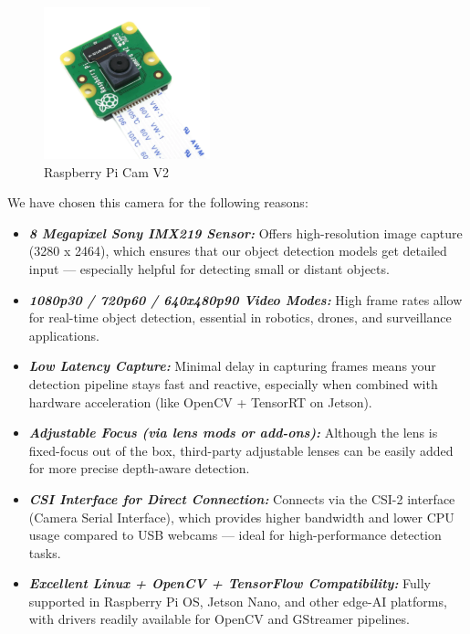 \documentclass[12pt]{report}
\begin{document}
      \begin{figure}
          \includegraphics[width=1\linewidth]{rpicam.png}
          \caption{Raspberry Pi Cam V2}
          \label{fig:rpicam}
        \end{figure}

        
        \noindent We have chosen this camera for the following reasons:
        \begin{itemize}
          \item \textbf{\textit{8 Megapixel Sony IMX219 Sensor:}} Offers high-resolution image capture (3280 x 2464), which ensures that our object detection models get detailed input — especially helpful for detecting small or distant objects. 
          \item \textbf{\textit{1080p30 / 720p60 / 640x480p90 Video Modes:}} High frame rates allow for real-time object detection, essential in robotics, drones, and surveillance applications.
          \item \textbf{\textit{Low Latency Capture:}} Minimal delay in capturing frames means your detection pipeline stays fast and reactive, especially when combined with hardware acceleration (like OpenCV + TensorRT on Jetson).
          \item \textbf{\textit{Adjustable Focus (via lens mods or add-ons):}} Although the lens is fixed-focus out of the box, third-party adjustable lenses can be easily added for more precise depth-aware detection.
          \item \textbf{\textit{CSI Interface for Direct Connection:}} Connects via the CSI-2 interface (Camera Serial Interface), which provides higher bandwidth and lower CPU usage compared to USB webcams — ideal for high-performance detection tasks.
          \item \textbf{\textit{Excellent Linux + OpenCV + TensorFlow Compatibility:}} Fully supported in Raspberry Pi OS, Jetson Nano, and other edge-AI platforms, with drivers readily available for OpenCV and GStreamer pipelines.
        \end{itemize}
        
\end{document}
